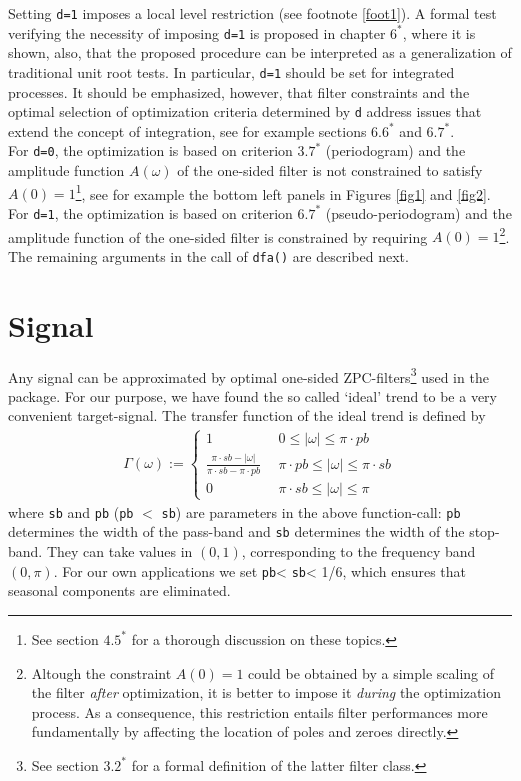 \documentclass[a4paper]{article}
\begin{document}
Setting \texttt{d=1} imposes a local level restriction (see footnote
\ref{foot1}). A formal test verifying the necessity of imposing
\texttt{d=1} is proposed in chapter $6^*$, where it is shown, also,
that the proposed procedure can be interpreted as a generalization of
traditional unit root tests. In particular, \texttt{d=1} should be set
for integrated processes. It should be emphasized, however, that
filter constraints and the optimal selection of optimization criteria
determined by \texttt{d} address issues that extend the concept of
integration, see for example sections $6.6^*$ and $6.7^*$. \\

For \texttt{d=0}, the optimization is based on criterion $3.7^*$
(periodogram) and the amplitude function $A(\omega)$ of the one-sided
filter is not constrained to satisfy $A(0)=1$\footnote{See section
  $4.5^*$ for a thorough discussion on these topics.}, see for example
the bottom left panels in Figures \ref{fig1} and \ref{fig2}. For
\texttt{d=1}, the optimization is based on criterion $6.7^*$
(pseudo-periodogram) and the amplitude function of the one-sided
filter is constrained by requiring $A(0)=1$\footnote{Altough the
  constraint $A(0)=1$ could be obtained by a simple scaling of the
  filter \emph{after} optimization, it is better to impose it
  \emph{during} the optimization process. As a consequence, this
  restriction entails filter performances more fundamentally by
  affecting the location of poles and zeroes directly.}. \\

The remaining arguments in the call of \texttt{dfa()} are described
next. 


\section{Signal}\label{sect3}

Any signal can be approximated by optimal one-sided
ZPC-filters\footnote{See section $3.2^*$ for a formal definition of
  the latter filter class.} used in the package. For our purpose, we
have found the so called `ideal' trend to be a very convenient
target-signal.  The transfer function of the ideal trend is defined by
\begin{eqnarray}
\label{tfile} {\Gamma}(\omega):=\left\{\begin{array}{lr}1&0\leq|\omega|\leq\pi 
\cdot pb \\ \displaystyle{\frac{\pi \cdot sb-|\omega|}{\pi \cdot sb-\pi \cdot 
pb}}~~&\pi \cdot pb\leq|\omega|\leq\pi \cdot sb\\ 0&\pi \cdot sb\leq|\omega|
\leq\pi\end{array}\right. 
\end{eqnarray}
where \texttt{sb} and \texttt{pb} (\texttt{pb} $<$ \texttt{sb}) are
parameters in the above function-call: \texttt{pb} determines the
width of the pass-band and \texttt{sb} determines the width of the
stop-band. They can take values in $(0,1)$, corresponding to the
frequency band $(0, \pi)$. For our own applications we set
\texttt{pb}< \texttt{sb}< 1/6, which ensures that seasonal components
are eliminated. 
\end{document}
